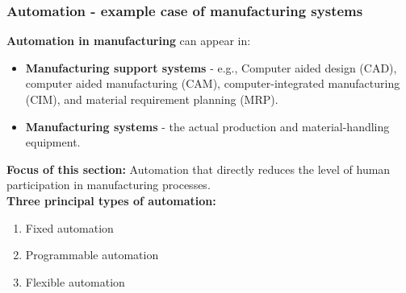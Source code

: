 \begin{frame}
	\frametitle{Automation - example case of manufacturing systems}
  \textbf{Automation in manufacturing} can appear in:
  \begin{itemize}
    \item \textbf{Manufacturing support systems} - e.g., Computer aided design (CAD), computer aided manufacturing (CAM), computer-integrated manufacturing (CIM)\footnotemark, and material requirement planning (MRP).
    \item \textbf{Manufacturing systems} - the actual production and material-handling equipment.
  \end{itemize}
  \vspace{3mm}
  \textbf{Focus of this section:}
  Automation that directly reduces the level of human participation in manufacturing processes.\\
  \vspace{3mm}
  \textbf{Three principal types of automation:}
  \begin{enumerate}
    \item Fixed automation
    \item Programmable automation
    \item Flexible automation
  \end{enumerate}
\end{frame}

